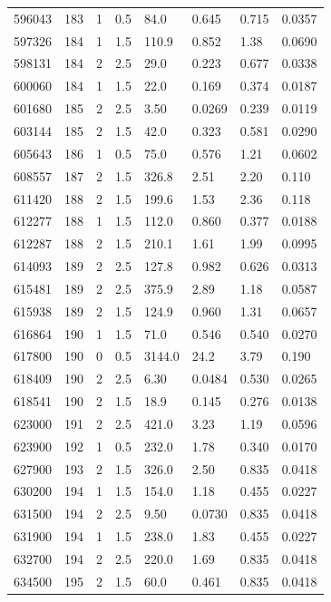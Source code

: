 \documentclass[preview]{standalone}
\begin{document}
{{{{{{{{\begin{tabular}{L{1.2cm}C{1.2cm} C{0.3cm}C{0.5cm} C{1.4cm}C{1.4cm} C{1.4cm}C{1.4cm}}
  596043  &   183  & 1     & 0.5 &  84.0  & 0.645  & 0.715 &  0.0357   \\ 
  597326  &   184  & 1     & 1.5 &  110.9  & 0.852  & 1.38 &  0.0690   \\ 
  598131  &   184  & 2     & 2.5 &  29.0  & 0.223  & 0.677 &  0.0338   \\ 
  600060  &   184  & 1     & 1.5 &  22.0  & 0.169  & 0.374 &  0.0187   \\ 
  601680  &   185  & 2     & 2.5 &  3.50  & 0.0269  & 0.239 &  0.0119   \\ 
  603144  &   185  & 2     & 1.5 &  42.0  & 0.323  & 0.581 &  0.0290   \\ 
  605643  &   186  & 1     & 0.5 &  75.0  & 0.576  & 1.21 &  0.0602   \\ 
  608557  &   187  & 2     & 1.5 &  326.8  & 2.51  & 2.20 &  0.110   \\ 
  611420  &   188  & 2     & 1.5 &  199.6  & 1.53  & 2.36 &  0.118   \\ 
  612277  &   188  & 1     & 1.5 &  112.0  & 0.860  & 0.377 &  0.0188   \\ 
  612287  &   188  & 2     & 1.5 &  210.1  & 1.61  & 1.99 &  0.0995   \\ 
  614093  &   189  & 2     & 2.5 &  127.8  & 0.982  & 0.626 &  0.0313   \\ 
  615481  &   189  & 2     & 2.5 &  375.9  & 2.89  & 1.18 &  0.0587   \\ 
  615938  &   189  & 2     & 1.5 &  124.9  & 0.960  & 1.31 &  0.0657   \\ 
  616864  &   190  & 1     & 1.5 &  71.0  & 0.546  & 0.540 &  0.0270   \\ 
  617800  &   190  & 0     & 0.5 &  3144.0  & 24.2  & 3.79 &  0.190   \\ 
  618409  &   190  & 2     & 2.5 &  6.30  & 0.0484  & 0.530 &  0.0265   \\ 
  618541  &   190  & 2     & 1.5 &  18.9  & 0.145  & 0.276 &  0.0138   \\ 
  623000  &   191  & 2     & 2.5 &  421.0  & 3.23  & 1.19 &  0.0596   \\ 
  623900  &   192  & 1     & 0.5 &  232.0  & 1.78  & 0.340 &  0.0170   \\ 
  627900  &   193  & 2     & 1.5 &  326.0  & 2.50  & 0.835 &  0.0418   \\ 
  630200  &   194  & 1     & 1.5 &  154.0  & 1.18  & 0.455 &  0.0227   \\ 
  631500  &   194  & 2     & 2.5 &  9.50  & 0.0730  & 0.835 &  0.0418   \\ 
  631900  &   194  & 1     & 1.5 &  238.0  & 1.83  & 0.455 &  0.0227   \\ 
  632700  &   194  & 2     & 2.5 &  220.0  & 1.69  & 0.835 &  0.0418   \\ 
  634500  &   195  & 2     & 1.5 &  60.0  & 0.461  & 0.835 &  0.0418   \\ 
\hline 
\end{tabular} 

}}}}}}}}
\end{document}
